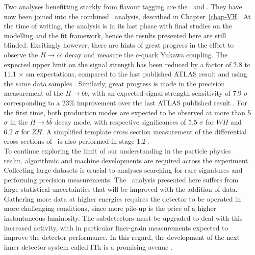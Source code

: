 Two analyses benefitting starkly from flavour tagging are the \vhb\ and \vhc. They have now been joined into the combined \vhbc\ analysis, described in Chapter~\ref{chap-VH}. At the time of writing, the analysis is in its last phase with final studies on the modelling and the fit framework, hence the results presented here are still blinded. Excitingly however, there are hints of great progress in the effort to observe the $H \rightarrow c\bar{c}$ decay and measure the $c$-quark Yukawa coupling. The expected upper limit on the signal strength has been reduced by a factor of 2.8 to 11.1 $\times$ \gls{sm} expectations, compared to the last published ATLAS result and using the same data samples \cite{Collaboration:2721696}. Similarly, great progress is made in the precision measurement of the $H \rightarrow b\bar{b}$, with an expected signal strength sensitivity of 7.9 $\sigma$ corresponding to a 23\% improvement over the last ATLAS published result \cite{ATLAS:2021wqh}. For the first time, both production modes are expected to be observed at more than 5 $\sigma$ in the $H \rightarrow b\bar{b}$ decay mode, with respective significances of 5.5 $\sigma$ for $WH$ and 6.2 $\sigma$ for $ZH$. A  simplified template cross section measurement of the differential cross sections of \vhb\ is also performed in stage 1.2 \cite{Butterworth:2015oua}. \\

To continue exploring the limit of our understanding in the particle physics realm, algorithmic and machine developments are required across the experiment. Collecting large datasets is crucial to analyses searching for rare signatures and performing precision measurements. The \vhbc\ analysis presented here suffers from large statistical uncertainties that will be improved with the addition of data. Gathering more data at higher energies requires the detector to be operated in more challenging conditions, since more pile-up is the price of a higher instantaneous luminosity. The subdetectors must be upgraded to deal with this increased activity, with in particular finer-grain measurements expected to improve the detector performance. In this regard, the development of the next inner detector system called ITk is a promising avenue \cite{Bortoletto:2022wcx}. \\

